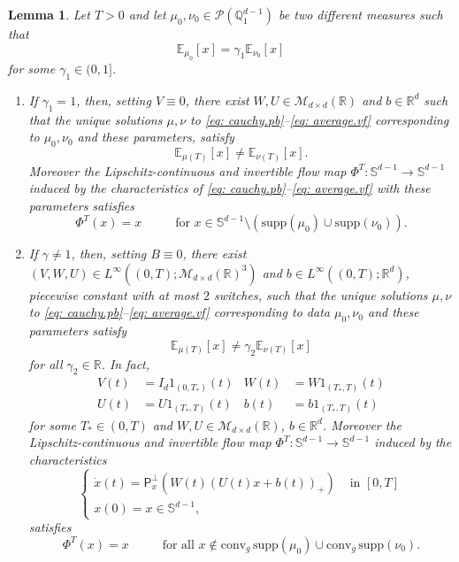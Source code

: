 \documentclass[a4paper,11pt]{article}
\theoremstyle{plain}
\newtheorem{lemma}[theorem]{Lemma}
\newcommand{\supp}{\mathrm{supp}}
\newcommand{\R}{\mathbb{R}}
\newcommand{\proj}{\bm{\mathsf{P}}^\perp}
\newcommand{\conv}{\mathrm{conv}}
\renewcommand{\S}{\mathbb{S}^{d-1}}
\newcommand{\bW}{\bm{\mathit{W}}}
\newcommand{\bV}{\bm{\mathit{V}}}
\newcommand{\bB}{\bm{\mathit{B}}}
\newcommand{\bU}{\bm{\mathit{U}}}
\newcommand{\Q}{\mathbb{Q}}
\numberwithin{equation}{section}
\begin{document}
\begin{lemma}\label{lem: perturbation} \label{lem: colinearity}
Let $T>0$ and let $\mu_0,\nu_0\in\mathscr{P}(\Q_1^{d-1})$ be two different measures such that
\begin{equation*}
        \mathbb{E}_{\mu_0}[x]= \gamma_1 \mathbb{E}_{\nu_0}[x]
    \end{equation*}
    for some $\gamma_1\in(0,1]$.
\begin{enumerate}
    \item If $\gamma_1=1$, then, setting $\bV\equiv0$, there exist $\bW,\bU\in\mathscr{M}_{d\times d}(\R)$ and $b\in \mathbb{R}^d$ such that the unique solutions $\mu, \nu$ to \eqref{eq: cauchy.pb}--\eqref{eq: average.vf} corresponding to $\mu_0, \nu_0$ and these parameters, satisfy
\begin{equation*}
    \mathbb{E}_{\mu(T)}[x]\neq \mathbb{E}_{\nu(T)}[x].
\end{equation*}
Moreover the Lipschitz-continuous and invertible flow map $\Phi^T:\S\to\S$ induced by the characteristics of \eqref{eq: cauchy.pb}--\eqref{eq: average.vf} with these parameters satisfies
\begin{equation}\label{eq: identity.flow}
    \Phi^T(x)=x\hspace{1cm}\text{ for }x\in \S\setminus\left(\supp(\mu_0)\cup\supp(\nu_0)\right).
\end{equation}
\item If $\gamma\neq 1$, then, setting $\bB\equiv0$, there exist $(\bV,\bW,\bU)\in L^\infty((0,T);\mathscr{M}_{d\times d}(\mathbb{R})^3)$ and $b\in L^\infty((0,T);\mathbb{R}^d)$,  piecewise constant with at most $2$ switches, such that the unique solutions $\mu, \nu$ to \eqref{eq: cauchy.pb}--\eqref{eq: average.vf} corresponding to data $\mu_0, \nu_0$ and these parameters satisfy
\begin{equation*}
    \mathbb{E}_{\mu(T)}[x]\neq\gamma_2\mathbb{E}_{\nu(T)}[x]
\end{equation*}
for all $\gamma_2\in\mathbb{R}$. In fact, 
\begin{align*}
  \bV(t)&=I_d 1_{(0,T_*)}(t) &  
  \bW(t)&=\bW 1_{(T_*,T)}(t) \\ 
  \bU(t)&=\bU 1_{(T_*,T)}(t) &
  b(t)&=b 1_{(T_*,T)}(t)  
\end{align*}
for some $T_*\in (0,T)$ and $\bW, \bU\in \mathscr{M}_{d\times d}(\mathbb{R})$, $b\in \mathbb{R}^d$. Moreover the Lipschitz-continuous and invertible flow map $\Phi^T:\S\to\S$ induced by the characteristics
\begin{equation*}
\begin{cases}
    \dot{x}(t)=\proj_x(\bW(t)(\bU(t) x+b(t))_+) &\text{ in } [0,T]\\
    x(0)=x\in\S,
\end{cases}    
\end{equation*}
satisfies
\begin{equation*}
  \Phi^T(x)=x\hspace{1cm} \text{ for all }x\notin \conv_g\, \supp(\mu_0)\cup \conv_g\, \supp(\nu_0).
\end{equation*}
\end{enumerate}
\end{lemma}
\end{document}

